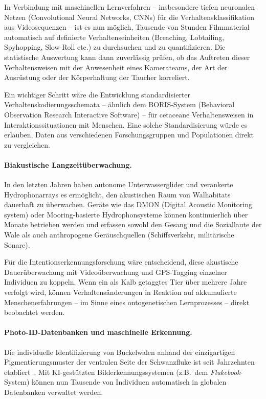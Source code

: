 ﻿\documentclass[12pt,a4paper]{article}
\theoremstyle{definition}
\theoremstyle{remark}
\begin{document}
In Verbindung mit maschinellen Lernverfahren -- insbesondere tiefen neuronalen Netzen (Convolutional Neural Networks, CNNs) für die Verhaltensklassifikation aus Videosequenzen -- ist es nun möglich, Tausende von Stunden Filmmaterial automatisch auf definierte Verhaltenseinheiten (Breaching, Lobtailing, Spyhopping, Slow-Roll etc.) zu durchsuchen und zu quantifizieren. Die statistische Auswertung kann dann zuverlässig prüfen, ob das Auftreten dieser Verhaltensweisen mit der Anwesenheit eines Kamerateams, der Art der Ausrüstung oder der Körperhaltung der Taucher korreliert.

Ein wichtiger Schritt wäre die Entwicklung standardisierter Verhaltenskodierungsschemata -- ähnlich dem BORIS-System (Behavioral Observation Research Interactive Software) -- für cetaceane Verhaltensweisen in Interaktionssituationen mit Menschen. Eine solche Standardisierung würde es erlauben, Daten aus verschiedenen Forschungsgruppen und Populationen direkt zu vergleichen.

\paragraph{Biakustische Langzeitüberwachung.}
In den letzten Jahren haben autonome Unterwasserglider und verankerte Hydrophonarrays es ermöglicht, den akustischen Raum von Walhabitats dauerhaft zu überwachen. Geräte wie das DMON (Digital Acoustic Monitoring system) oder Mooring-basierte Hydrophonsysteme können kontinuierlich über Monate betrieben werden und erfassen sowohl den Gesang und die Soziallaute der Wale als auch anthropogene Geräuschquellen (Schiffsverkehr, militärische Sonare).

Für die Intentionserkennungsforschung wäre entscheidend, diese akustische Dauerüberwachung mit Videoüberwachung und GPS-Tagging einzelner Individuen zu koppeln. Wenn ein als Kalb getaggtes Tier über mehrere Jahre verfolgt wird, können Verhaltensänderungen in Reaktion auf akkumulierte Menschenerfahrungen -- im Sinne eines ontogenetischen Lernprozesses -- direkt beobachtet werden.

\paragraph{Photo-ID-Datenbanken und maschinelle Erkennung.}
Die individuelle Identifizierung von Buckelwalen anhand der einzigartigen Pigmentierungsmuster der ventralen Seite der Schwanzfluke ist seit Jahrzehnten etabliert~\cite{payne1971songs}. Mit KI-gestützten Bilderkennungssystemen (z.B.\ dem \textit{Flukebook}-System) können nun Tausende von Individuen automatisch in globalen Datenbanken verwaltet werden.
\end{document}
